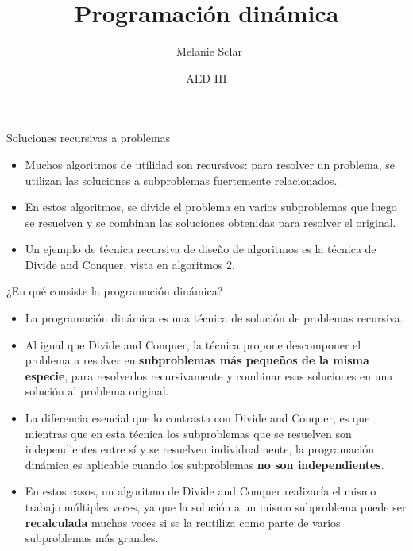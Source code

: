 \documentclass[compress]{beamer}
\title[Programación dinámica] %
{Programación dinámica}
\author[Melanie Sclar] %
{~Melanie Sclar}
\institute[UBA] %
{
  Facultad de Ciencias Exactas y Naturales\\
  Universidad de Buenos Aires
}
\date[AED III] %
{AED III}
\begin{document}
\begin{frame}
  \titlepage
\end{frame}


\begin{frame}{Soluciones recursivas a problemas}

  \begin{itemize}
   \item Muchos algoritmos de utilidad son recursivos: para resolver un problema, se utilizan las soluciones a subproblemas fuertemente relacionados.
   \item En estos algoritmos, se divide el problema en varios subproblemas 
   que luego se resuelven y se combinan las soluciones obtenidas para resolver el original.
   \item Un ejemplo de técnica recursiva de diseño de algoritmos es la técnica de Divide and Conquer, vista en algoritmos 2.
  \end{itemize}
  
\end{frame}

\begin{frame}{¿En qué consiste la programación dinámica?}
\small
  \begin{itemize}
   \item La programación dinámica es una técnica de solución de problemas recursiva.
   \item Al igual que Divide and Conquer, la técnica propone descomponer el problema a resolver en \textbf{subproblemas más pequeños de la
   misma especie}, para resolverlos recursivamente y combinar esas soluciones en una solución al problema original.
   \item La diferencia esencial que lo contrasta con Divide and Conquer, es que mientras que en esta técnica los subproblemas que se resuelven
    son independientes entre sí y se resuelven individualmente, la programación dinámica es aplicable cuando los subproblemas \textbf{no son independientes}.
   \item En estos casos, un algoritmo de Divide and Conquer realizaría el mismo trabajo múltiples veces, ya que la solución a un mismo subproblema puede
   ser \textbf{recalculada} muchas veces si se la reutiliza como parte de varios subproblemas más grandes.
  \end{itemize}
    
\end{frame}
\end{document}

